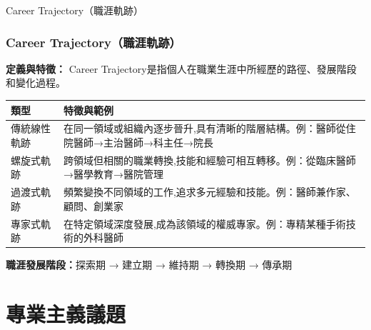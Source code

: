 \documentclass[aspectratio=169]{beamer}
\newcommand{\contentsize}{\fontsize{9pt}{11pt}\selectfont}
\newcommand{\tablesize}{\fontsize{7.5pt}{9pt}\selectfont}
\begin{document}
\begin{frame}{Career Trajectory（職涯軌跡）}
\frametitle{Career Trajectory（職涯軌跡）}
\contentsize

\textbf{定義與特徵：}
Career Trajectory是指個人在職業生涯中所經歷的路徑、發展階段和變化過程。

\vspace{0.3cm}

\begin{table}[h]
\centering
\tablesize
\begin{tabular}{p{3.5cm}p{7.5cm}}
\toprule
\textbf{類型} & \textbf{特徵與範例} \\
\midrule
傳統線性軌跡 & 在同一領域或組織內逐步晉升,具有清晰的階層結構。例：醫師從住院醫師→主治醫師→科主任→院長 \\
\midrule
螺旋式軌跡 & 跨領域但相關的職業轉換,技能和經驗可相互轉移。例：從臨床醫師→醫學教育→醫院管理 \\
\midrule
過渡式軌跡 & 頻繁變換不同領域的工作,追求多元經驗和技能。例：醫師兼作家、顧問、創業家 \\
\midrule
專家式軌跡 & 在特定領域深度發展,成為該領域的權威專家。例：專精某種手術技術的外科醫師 \\
\bottomrule
\end{tabular}
\end{table}

\vspace{0.3cm}

\textbf{職涯發展階段：}探索期 → 建立期 → 維持期 → 轉換期 → 傳承期
\end{frame}

\section{專業主義議題}
\end{document}
